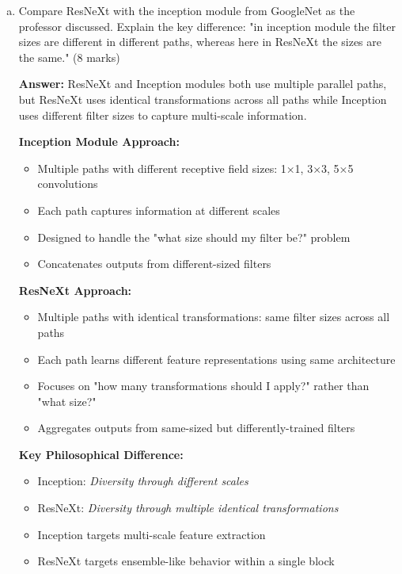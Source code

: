 \documentclass[12pt]{article}
\newcommand{\answer}[1]{{\color{answercolor}\textbf{Answer:} #1}}
\newcommand{\explanation}[1]{{\color{explanationcolor}#1}}
\begin{document}
\begin{enumerate}[(a)]
    \item Compare ResNeXt with the inception module from GoogleNet as the professor discussed. Explain the key difference: "in inception module the filter sizes are different in different paths, whereas here in ResNeXt the sizes are the same." \hfill (8 marks)
    
    \answer{ResNeXt and Inception modules both use multiple parallel paths, but ResNeXt uses identical transformations across all paths while Inception uses different filter sizes to capture multi-scale information.}
    
    \explanation{
    \textbf{Inception Module Approach:}
    \begin{itemize}
        \item Multiple paths with different receptive field sizes: 1×1, 3×3, 5×5 convolutions
        \item Each path captures information at different scales
        \item Designed to handle the "what size should my filter be?" problem
        \item Concatenates outputs from different-sized filters
    \end{itemize}
    
    \textbf{ResNeXt Approach:}
    \begin{itemize}
        \item Multiple paths with identical transformations: same filter sizes across all paths
        \item Each path learns different feature representations using same architecture
        \item Focuses on "how many transformations should I apply?" rather than "what size?"
        \item Aggregates outputs from same-sized but differently-trained filters
    \end{itemize}
    
    \textbf{Key Philosophical Difference:}
    \begin{itemize}
        \item Inception: \textit{Diversity through different scales}
        \item ResNeXt: \textit{Diversity through multiple identical transformations}
        \item Inception targets multi-scale feature extraction
        \item ResNeXt targets ensemble-like behavior within a single block
    \end{itemize}
    }
    

\end{enumerate}
\end{document}
